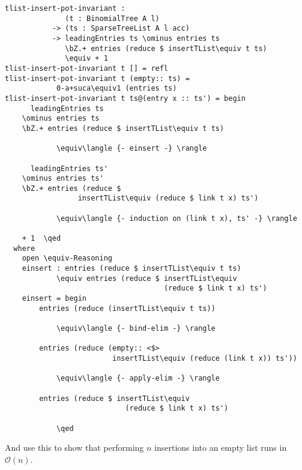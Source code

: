 \begin{lstlisting}[caption={Insertion runs in constant time},label={lst:binomial:constinsert},emph={tlist,insert,pot,invariant,empty,entry,BinomialTree,SparseTreeList,leadingEntries,entries,insertTList}]
tlist-insert-pot-invariant :
              (t : BinomialTree A l)
           -> (ts : SparseTreeList A l acc)
           -> leadingEntries ts \ominus entries ts
              \bZ.+ entries (reduce $ insertTList\equiv t ts)
              \equiv + 1
tlist-insert-pot-invariant t [] = refl
tlist-insert-pot-invariant t (empty:: ts) =
            0-a+suca\equiv1 (entries ts)
tlist-insert-pot-invariant t ts@(entry x :: ts') = begin
      leadingEntries ts
    \ominus entries ts
    \bZ.+ entries (reduce $ insertTList\equiv t ts)

            \equiv\langle {- einsert -} \rangle

      leadingEntries ts'
    \ominus entries ts'
    \bZ.+ entries (reduce $
                 insertTList\equiv (reduce $ link t x) ts')

            \equiv\langle {- induction on (link t x), ts' -} \rangle

    + 1  \qed
  where
    open \equiv-Reasoning
    einsert : entries (reduce $ insertTList\equiv t ts)
            \equiv entries (reduce $ insertTList\equiv
                                     (reduce $ link t x) ts')
    einsert = begin
        entries (reduce (insertTList\equiv t ts))

            \equiv\langle {- bind-elim -} \rangle

        entries (reduce (empty:: <$>
                         insertTList\equiv (reduce (link t x)) ts'))

            \equiv\langle {- apply-elim -} \rangle

        entries (reduce $ insertTList\equiv
                            (reduce $ link t x) ts')

            \qed

\end{lstlisting}

And use this to show that performing $n$ insertions into an empty list runs in $\mathcal O(n)$.

